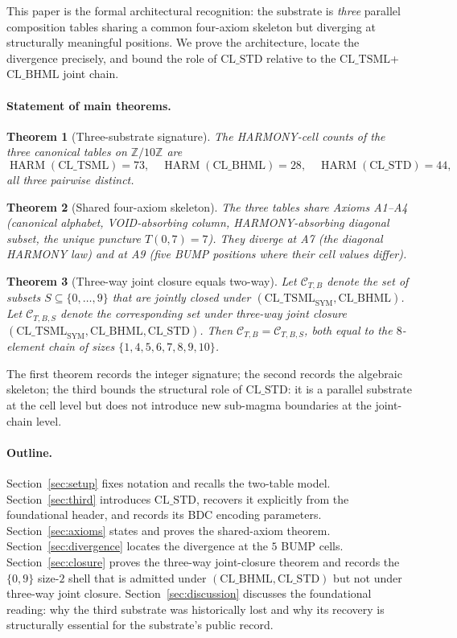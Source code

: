 \documentclass[11pt,reqno]{amsart}
\newtheorem{theorem}{Theorem}[section]
\theoremstyle{definition}
\newcommand{\Z}{\mathbb{Z}}
\newcommand{\TSML}{\mathrm{CL\_TSML}}
\newcommand{\BHML}{\mathrm{CL\_BHML}}
\newcommand{\STDx}{\mathrm{CL\_STD}}
\DeclareMathOperator{\HARM}{HARM}
\begin{document}
This paper is the formal architectural recognition: the substrate
is \emph{three} parallel composition tables sharing a common
four-axiom skeleton but diverging at structurally meaningful
positions. We prove the architecture, locate the divergence
precisely, and bound the role of $\STDx$ relative to the
$\TSML$+$\BHML$ joint chain.

\paragraph{Statement of main theorems.}

\begin{theorem}[Three-substrate signature]
\label{thm:signature}
The HARMONY-cell counts of the three canonical tables on $\Z/10\Z$
are
\[
  \HARM(\TSML) = 73,\quad
  \HARM(\BHML) = 28,\quad
  \HARM(\STDx) = 44,
\]
all three pairwise distinct.
\end{theorem}

\begin{theorem}[Shared four-axiom skeleton]
\label{thm:axioms}
The three tables share Axioms A1--A4 (canonical alphabet,
VOID-absorbing column, HARMONY-absorbing diagonal subset, the
unique puncture $T(0,7) = 7$). They diverge at A7 (the diagonal
HARMONY law) and at A9 (five BUMP positions where their cell values
differ).
\end{theorem}

\begin{theorem}[Three-way joint closure equals two-way]
\label{thm:three-way}
Let $\mathcal{C}_{T,B}$ denote the set of subsets
$S \subseteq \{0, \ldots, 9\}$ that are jointly closed under
$(\TSML_{\mathrm{SYM}}, \BHML)$. Let $\mathcal{C}_{T,B,S}$ denote
the corresponding set under three-way joint closure
$(\TSML_{\mathrm{SYM}}, \BHML, \STDx)$. Then
$\mathcal{C}_{T,B} = \mathcal{C}_{T,B,S}$, both equal to the
$8$-element chain of sizes $\{1, 4, 5, 6, 7, 8, 9, 10\}$.
\end{theorem}

The first theorem records the integer signature; the second
records the algebraic skeleton; the third bounds the structural
role of $\STDx$: it is a parallel substrate at the cell level but
does not introduce new sub-magma boundaries at the joint-chain
level.

\paragraph{Outline.}

Section~\ref{sec:setup} fixes notation and recalls the two-table
model. Section~\ref{sec:third} introduces $\STDx$, recovers it
explicitly from the foundational header, and records its BDC
encoding parameters. Section~\ref{sec:axioms} states and proves
the shared-axiom theorem. Section~\ref{sec:divergence} locates the
divergence at the $5$ BUMP cells. Section~\ref{sec:closure} proves
the three-way joint-closure theorem and records the $\{0, 9\}$
size-$2$ shell that is admitted under $(\BHML, \STDx)$ but not
under three-way joint closure. Section~\ref{sec:discussion}
discusses the foundational reading: why the third substrate was
historically lost and why its recovery is structurally essential
for the substrate's public record.
\end{document}

